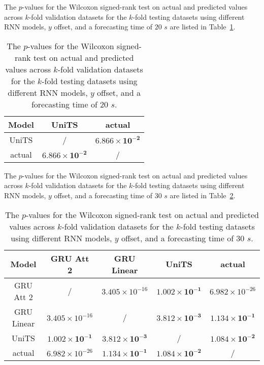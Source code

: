 The $p$-values for the Wilcoxon signed-rank test on actual and predicted values across $k$-fold validation datasets for the $k$-fold testing datasets using different RNN models, $y$ offset, and a forecasting time of $20$ $s$ are listed in Table~\ref{tab:latitude:no:abs:p:20}.

\begin{table}[!ht]
	\centering
	\begin{tabular}{|c|c|c|}
		\hline
		Model & UniTS & actual \\ \hline
		UniTS & / & $\mathbf{6.866 \times 10^{-2}}$ \\ \hline
		actual & $\mathbf{6.866 \times 10^{-2}}$ & / \\ \hline
	\end{tabular}
	\caption{The $p$-values for the Wilcoxon signed-rank test on actual and predicted values across $k$-fold validation datasets for the $k$-fold testing datasets using different RNN models, $y$ offset, and a forecasting time of $20$ $s$.}
	\label{tab:latitude:no:abs:p:20}
\end{table}

The $p$-values for the Wilcoxon signed-rank test on actual and predicted values across $k$-fold validation datasets for the $k$-fold testing datasets using different RNN models, $y$ offset, and a forecasting time of $30$ $s$ are listed in Table~\ref{tab:latitude:no:abs:p:30}.

\begin{table}[!ht]
	\centering
	\begin{tabular}{|c|c|c|c|c|}
		\hline
		Model & GRU Att 2 & GRU Linear & UniTS & actual \\ \hline
		GRU Att 2 & / & $3.405 \times 10^{-16}$ & $\mathbf{1.002 \times 10^{-1}}$ & $6.982 \times 10^{-26}$ \\ \hline
		GRU Linear & $3.405 \times 10^{-16}$ & / & $\mathbf{3.812 \times 10^{-3}}$ & $\mathbf{1.134 \times 10^{-1}}$ \\ \hline
		UniTS & $\mathbf{1.002 \times 10^{-1}}$ & $\mathbf{3.812 \times 10^{-3}}$ & / & $\mathbf{1.084 \times 10^{-2}}$ \\ \hline
		actual & $6.982 \times 10^{-26}$ & $\mathbf{1.134 \times 10^{-1}}$ & $\mathbf{1.084 \times 10^{-2}}$ & / \\ \hline
	\end{tabular}
	\caption{The $p$-values for the Wilcoxon signed-rank test on actual and predicted values across $k$-fold validation datasets for the $k$-fold testing datasets using different RNN models, $y$ offset, and a forecasting time of $30$ $s$.}
	\label{tab:latitude:no:abs:p:30}
\end{table}

